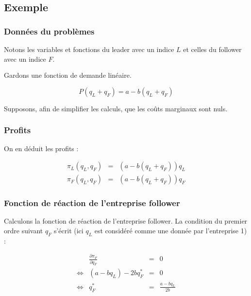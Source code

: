 \documentclass[
]{book}
\theoremstyle{definition}
\theoremstyle{definition}
\theoremstyle{definition}
\theoremstyle{definition}
\theoremstyle{remark}
\begin{document}
\hypertarget{exemple-1}{%
\subsection{Exemple}\label{exemple-1}}

\hypertarget{donnuxe9es-du-probluxe8mes}{%
\subsubsection{Données du problèmes}\label{donnuxe9es-du-probluxe8mes}}

Notons les variables et fonctions du leader avec un indice \(L\) et celles du follower avec un indice \(F\).

Gardons une fonction de demande linéaire.

\[
P(q_L+q_F) = a - b(q_L+q_F)
\]

Supposons, afin de simplifier les calculs, que les coûts marginaux sont nuls.

\hypertarget{profits-1}{%
\subsubsection{Profits}\label{profits-1}}

On en déduit les profits :

\[
\begin{array}{rcl}
\pi_L(q_L, q_F) &=& \left(a-b(q_L+q_F)\right)q_L\\
\pi_F(q_L, q_F) &=& \left(a-b(q_L+q_F)\right)q_F
\end{array}
\]

\hypertarget{fonction-de-ruxe9action-de-lentreprise-follower}{%
\subsubsection{Fonction de réaction de l'entreprise follower}\label{fonction-de-ruxe9action-de-lentreprise-follower}}

Calculons la fonction de réaction de l'entreprise follower.
La condition du premier ordre suivant \(q_F\) s'écrit (ici \(q_L\) est considéré comme une donnée par l'entreprise 1) :

\[
\begin{array}{crcl}
&\frac{\partial \pi_F}{\partial q_F}&=&0\\
\Leftrightarrow & (a-bq_L)-2bq_F^* &=& 0\\
\Leftrightarrow & q_F^* &=& \frac{a-bq_L}{2b}
\label{eq:FRFollower}
\end{array}
\]
\end{document}
